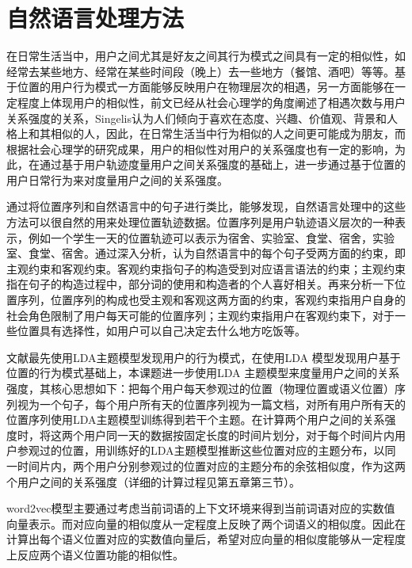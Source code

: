 \section{自然语言处理方法}
\label{sec:section2-3}
在日常生活当中，用户之间尤其是好友之间其行为模式之间具有一定的相似性，如经常去某些地方、经常在某些时间段（晚上）去一些地方（餐馆、酒吧）等等。基于位置的用户行为模式一方面能够反映用户在物理层次的相遇，另一方面能够在一定程度上体现用户的相似性，前文已经从社会心理学的角度阐述了相遇次数与用户关系强度的关系，Singelis认为人们倾向于喜欢在态度、兴趣、价值观、背景和人格上和其相似的人，因此，在日常生活当中行为相似的人之间更可能成为朋友，而根据社会心理学的研究成果，用户的相似性对用户的关系强度也有一定的影响，为此，在通过基于用户轨迹度量用户之间关系强度的基础上，进一步通过基于位置的用户日常行为来对度量用户之间的关系强度。
\par 通过将位置序列和自然语言中的句子进行类比，能够发现，自然语言处理中的这些方法可以很自然的用来处理位置轨迹数据。位置序列是用户轨迹语义层次的一种表示，例如一个学生一天的位置轨迹可以表示为宿舍、实验室、食堂、宿舍，实验室、食堂、宿舍。通过深入分析，认为自然语言中的每个句子受两方面的约束，即主观约束和客观约束。客观约束指句子的构造受到对应语言语法的约束；主观约束指在句子的构造过程中，部分词的使用和构造者的个人喜好相关。再来分析一下位置序列，位置序列的构成也受主观和客观这两方面的约束，客观约束指用户自身的社会角色限制了用户每天可能的位置序列；主观约束指用户在客观约束下，对于一些位置具有选择性，如用户可以自己决定去什么地方吃饭等。
\par 文献\cite{farrahi2008did}最先使用LDA主题模型发现用户的行为模式，在使用LDA 模型发现用户基于位置的行为模式基础上，本课题进一步使用LDA 主题模型来度量用户之间的关系强度，其核心思想如下：把每个用户每天参观过的位置（物理位置或语义位置）序列视为一个句子，每个用户所有天的位置序列视为一篇文档，对所有用户所有天的位置序列使用LDA主题模型训练得到若干个主题。在计算两个用户之间的关系强度时，将这两个用户同一天的数据按固定长度的时间片划分，对于每个时间片内用户参观过的位置，用训练好的LDA主题模型推断这些位置对应的主题分布，以同一时间片内，两个用户分别参观过的位置对应的主题分布的余弦相似度，作为这两个用户之间的关系强度（详细的计算过程见第五章第三节）。
\par word2vec模型主要通过考虑当前词语的上下文环境来得到当前词语对应的实数值向量表示。而对应向量的相似度从一定程度上反映了两个词语义的相似度。因此在计算出每个语义位置对应的实数值向量后，希望对应向量的相似度能够从一定程度上反应两个语义位置功能的相似性。
